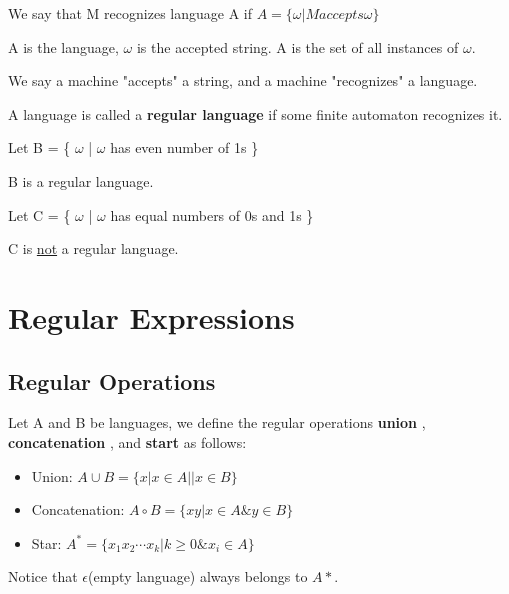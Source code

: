 We say that M recognizes language A if \(A = \{ \omega| M accepts \omega \} \) 
\begin{note}
    A is the language, \(\omega\) is the accepted string. 
    A is the set of all instances of \(\omega\). 
    
    We say a machine "accepts" a string, and a machine "recognizes" a language.
\end{note}

\begin{definition}
    A language is called a \textbf{regular language} if some finite automaton recognizes it. 
\end{definition}

\begin{eg}
    Let B = \{ \( \omega\) | \(\omega\) has even number of 1s \}
    
    B is a regular language.
\end{eg}

\begin{eg}
    Let C = \{ \(\omega\) | \(\omega\) has equal numbers of 0s and 1s \}

    C is \underline{not} a regular language. 
\end{eg}

\section{Regular Expressions}
\subsection{Regular Operations}

\begin{definition}
    Let A and B be languages, we define the regular operations \textbf{union} , \textbf{concatenation} , and \textbf{start} as follows:
    \begin{itemize}
        \item Union: \(A \cup B = \{ x | x \in A || x \in B \} \) 
        \item Concatenation: \(A \circ B = \{ xy | x\in A \& y \in B \} \) 
        \item Star: \(A^* = \{x_1 x_2 \cdots x_k | k \geq 0 \& x_i \in A\}\) 
    \end{itemize}
    
    Notice that \(\epsilon\)(empty language) always belongs to \(A*\).  
\end{definition}

